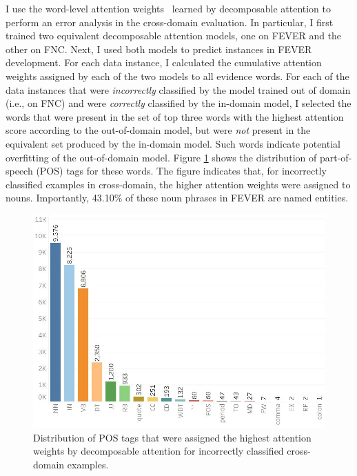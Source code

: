 \documentclass{article}
\begin{document}
I use the word-level attention weights~\citep*{bahdanau2014neural} learned by decomposable attention to perform  an error analysis in the cross-domain evaluation. 
In particular, I first trained two equivalent decomposable attention models, one on FEVER and the other on FNC. 
Next, I used both models to predict instances in FEVER development. For each data instance, I calculated the cumulative attention weights assigned by each of the two models to all evidence words. 
For each of the data instances that were {\em incorrectly} classified by the model trained out of domain (i.e., on FNC) and were {\em correctly} classified by the in-domain model, 
I  selected the words that were present in the set of top three words with the highest attention score according to the out-of-domain model, but were {\em not} present in the equivalent set produced by the in-domain model. Such words indicate potential overfitting of the out-of-domain model. 
Figure \ref{fig:attention} shows the distribution of part-of-speech (POS) tags for these words. The figure indicates that, for incorrectly classified examples in cross-domain, the higher attention weights were assigned to nouns.
Importantly, 43.10\% of these noun phrases in FEVER are named entities. 



\begin{figure}
 \includegraphics[width=0.95\linewidth]{histogram_2.jpg}
    \vspace{-3mm}
    \caption{ Distribution of POS tags that were assigned the highest attention weights by decomposable attention for incorrectly classified cross-domain examples.}
  \label{fig:attention}
\vspace{-6mm}
\end{figure}
\end{document}
